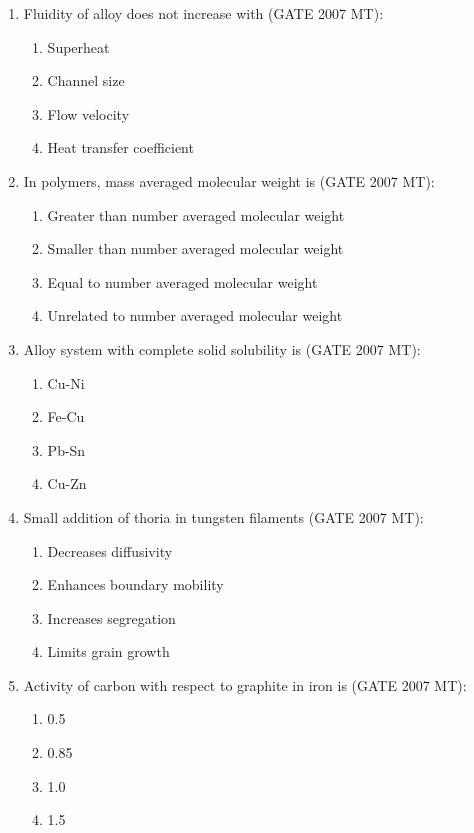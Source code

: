 \documentclass[12pt]{article}
\begin{document}
\begin{enumerate}
\item Fluidity of alloy does not increase with (GATE 2007 MT):
    \begin{enumerate}
        \item Superheat
        \item Channel size
        \item Flow velocity
        \item Heat transfer coefficient
    \end{enumerate}

\item In polymers, mass averaged molecular weight is (GATE 2007 MT):
    \begin{enumerate}
        \item Greater than number averaged molecular weight
        \item Smaller than number averaged molecular weight
        \item Equal to number averaged molecular weight
        \item Unrelated to number averaged molecular weight
    \end{enumerate}

\item Alloy system with complete solid solubility is (GATE 2007 MT):
    \begin{enumerate}
        \item Cu-Ni
        \item Fe-Cu
        \item Pb-Sn
        \item Cu-Zn
    \end{enumerate}

\item Small addition of thoria in tungsten filaments (GATE 2007 MT):
    \begin{enumerate}
        \item Decreases diffusivity
        \item Enhances boundary mobility
        \item Increases segregation
        \item Limits grain growth
    \end{enumerate}

\item Activity of carbon with respect to graphite in iron is (GATE 2007 MT):
    \begin{enumerate}
        \item 0.5
        \item 0.85
        \item 1.0
        \item 1.5
    \end{enumerate}


\end{enumerate}
\end{document}
